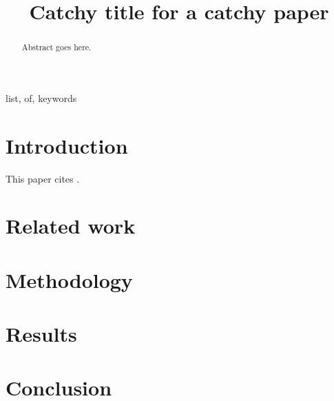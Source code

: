 \documentclass[conference]{IEEEtran}
\begin{document}
\title{Catchy title for a catchy paper}


\author{
}

\maketitle

\begin{abstract}
    Abstract goes here. 
\end{abstract}

\begin{IEEEkeywords}
list, of, keywords
\end{IEEEkeywords}


\section{Introduction}
\label{sec:intro}

This paper cites \citet{johndoe}.

\section{Related work}
\label{sec:related}

\section{Methodology}
\label{sec:methodology}

\section{Results}
\label{sec:results}

\section{Conclusion}
\label{sec:conclusion}

\printbibliography

\end{document}
